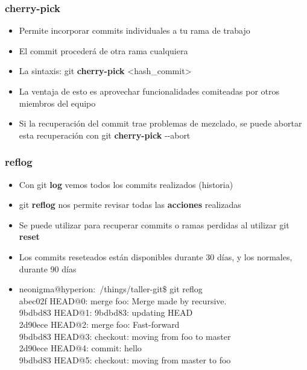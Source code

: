 \frame
{
\frametitle{cherry-pick}
 \begin{itemize}
  \item Permite incorporar commits individuales a tu rama de trabajo
  \item El commit procederá de otra rama cualquiera
  \item La sintaxis: git \textbf{cherry-pick} <hash\_commit>
  \item La ventaja de esto es aprovechar funcionalidades comiteadas por otros miembros del equipo
  \item Si la recuperación del commit trae problemas de mezclado, se puede abortar esta recuperación con git \textbf{cherry-pick} -{}-abort
 \end{itemize}
}

\frame
{
\frametitle{reflog}
 \begin{itemize}
  \item Con git \textbf{log} vemos todos los commits realizados (historia)
  \item git \textbf{reflog} nos permite revisar todas las \textbf{acciones} realizadas
  \item Se puede utilizar para recuperar commits o ramas perdidas al utilizar git \textbf{reset}
  \item Los commits reseteados están disponibles durante 30 días, y los normales, durante 90 días
  \item[] \footnotesize 
	neonigma@hyperion:~/things/taller-git\$ git reflog\\
	abec02f HEAD@{0}: merge foo: Merge made by recursive.\\
	9bdbd83 HEAD@{1}: 9bdbd83: updating HEAD\\
	2d90ece HEAD@{2}: merge foo: Fast-forward\\
	9bdbd83 HEAD@{3}: checkout: moving from foo to master\\
	2d90ece HEAD@{4}: commit: hello\\
	9bdbd83 HEAD@{5}: checkout: moving from master to foo
\end{itemize}
}

